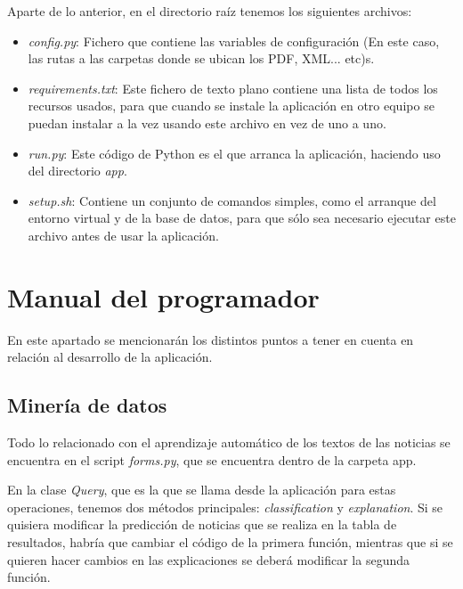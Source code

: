 Aparte de lo anterior, en el directorio raíz tenemos los siguientes archivos:

\begin{itemize}

\item \emph{config.py}: Fichero que contiene las variables de configuración (En este caso, las rutas a las carpetas donde se ubican los PDF, XML... etc)s.

\item \emph{requirements.txt}: Este fichero de texto plano contiene una lista de todos los recursos usados, para que cuando se instale la aplicación en otro equipo se puedan instalar a la vez usando este archivo en vez de uno a uno.

\item \emph{run.py}: Este código de Python es el que arranca la aplicación, haciendo uso del directorio \emph{app}.

\item \emph{setup.sh}: Contiene un conjunto de comandos simples, como el arranque del entorno virtual y de la base de datos, para que sólo sea necesario ejecutar este archivo antes de usar la aplicación.

\end{itemize}

\section{Manual del programador}

En este apartado se mencionarán los distintos puntos a tener en cuenta en relación al desarrollo de la aplicación.

\subsection{Minería de datos}

Todo lo relacionado con el aprendizaje automático de los textos de las noticias se encuentra en el script \emph{forms.py}, que se encuentra dentro de la carpeta app. 

En la clase \emph{Query}, que es la que se llama desde la aplicación para estas operaciones, tenemos dos métodos principales: \emph{classification} y \emph{explanation}. Si se quisiera modificar la predicción de noticias que se realiza en la tabla de resultados, habría que cambiar el código de la primera función, mientras que si se quieren hacer cambios en las explicaciones se deberá modificar la segunda función.

